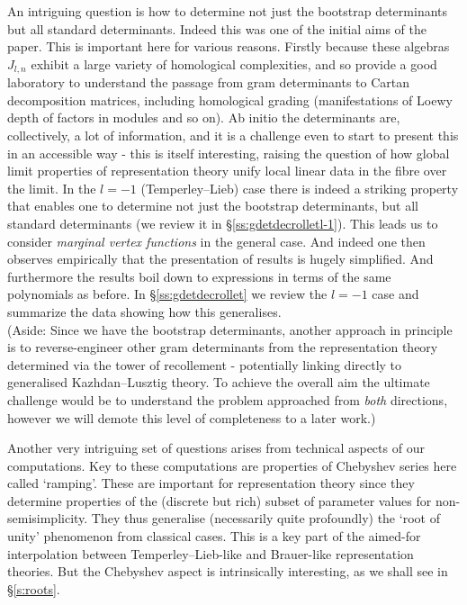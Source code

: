 \documentclass{article}
\theoremstyle{definition}
\newcommand{\ramping}{ramping}
\numberwithin{equation}{subsection}
\begin{document}
An intriguing question is how to determine not just the bootstrap determinants but all standard determinants. 
Indeed this was one of the initial aims of the paper. 
This is important here 
for various reasons. Firstly 
because these algebras $J_{l,n}$ exhibit a large variety of homological complexities, and so 
provide a good laboratory to understand the passage from gram determinants to Cartan decomposition matrices, 
including homological grading (manifestations of Loewy depth of factors in modules and so on). 
Ab initio the determinants are, collectively, a lot of information, and it is a challenge even to start to present this in an accessible way - this is itself interesting, raising the question of how global limit properties of representation theory unify local linear data in the fibre over the limit.  
In the $l=-1$ (Temperley--Lieb) case there is indeed a striking property that enables one to determine 
not just the bootstrap determinants, but all standard determinants (we review it in \S\ref{ss:gdetdecrolletl-1}). 
This leads us to consider {\em marginal vertex functions} in the general case. 
And indeed one then observes empirically that the presentation of results is hugely simplified. 
And furthermore the results boil down to expressions in terms of the same polynomials as before. 
In \S\ref{ss:gdetdecrollet} we review the $l=-1$ case and summarize the data showing how this generalises. 
\\
(Aside: Since we have the bootstrap determinants, another approach in principle is to reverse-engineer other gram determinants from the representation theory determined via the tower of recollement - potentially linking directly to generalised Kazhdan--Lusztig theory. To achieve the overall aim the ultimate challenge would be to understand the problem approached from {\em both} directions, however we will demote this level of completeness to  a later work.)

\medskip 

Another very intriguing set of questions arises from technical aspects of our computations. 
Key to these computations are properties of Chebyshev series here called `\ramping'. 
These are important for representation theory since they determine properties of the (discrete but rich) subset of parameter values for non-semisimplicity. 
They thus generalise 
(necessarily quite profoundly)
the `root of unity' phenomenon from classical cases. This is a key part of the aimed-for interpolation between Temperley--Lieb-like and Brauer-like representation theories. But the Chebyshev aspect is intrinsically interesting, as we shall see in \S\ref{s:roots}. 
\end{document}
